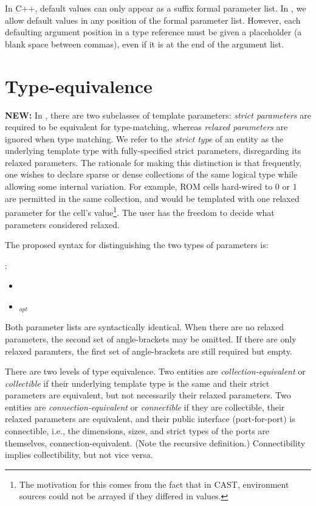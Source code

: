 In C++, default values can only appear as a suffix formal parameter list.  
In \hac, we allow default values in any position of the formal 
parameter list.  
However, each defaulting argument position in a type reference
must be given a placeholder (a blank space between commas), 
even if it is at the end of the argument list.  


\section{Type-equivalence}
\label{sec:templates:equivalence}

\textbf{NEW:}
In \hac, there are two subclasses of template parameters:
\emph{strict parameters} are required to be equivalent for type-matching,
whereas \emph{relaxed parameters} are ignored when type matching.  
We refer to the \emph{strict type} of an entity as the 
underlying template type with fully-specified strict parameters, 
disregarding its relaxed parameters.  
The rationale for making this distinction is that frequently, 
one wishes to declare sparse or dense collections of the same 
logical type while allowing some internal variation.  
For example, ROM cells hard-wired to $0$ or $1$ are permitted
in the same collection, and would be templated with one relaxed 
parameter for the cell's value\footnote{
The motivation for this comes from the fact that in CAST, 
environment sources could not be arrayed if they differed in values.}.
The user has the freedom to decide what parameters considered relaxed.  

The proposed syntax for distinguishing the two types of parameters is:

\medskip
\noindent
{}:
\begin{itemize}
\item {} \ttt{<}  \ttt{>}
\item {} \ttt{<} $_{opt}$ \ttt{>}
	\ttt{<}  \ttt{>}
\end{itemize}
Both parameter lists are syntactically identical.  
When there are no relaxed parameters, the second set of angle-brackets
may be omitted.  
If there are only relaxed paramters, the first set of angle-brackets
are still required but empty.  


There are two levels of type equivalence.  
Two entities are \emph{collection-equivalent} or \emph{collectible}
if their underlying template type is the same and their 
strict parameters are equivalent, 
but not necessarily their relaxed parameters.  
Two entities are \emph{connection-equivalent} or \emph{connectible}
if they are collectible, their relaxed parameters are equivalent, 
and their public interface (port-for-port) is connectible, i.e., 
the dimensions, sizes, and strict types of the ports are themselves, 
connection-equivalent.  
(Note the recursive definition.)
Connectibility implies collectibility, but not vice versa.  

